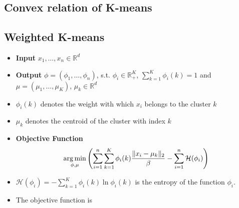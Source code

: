 \documentclass{article}
\begin{document}
\subsection{Convex relation of K-means}


\subsection{Weighted K-means}

\begin{itemize}
    \item \textbf{Input} $x_1, \dots, x_n \in \mathbb{R}^d$
    \item \textbf{Output} $\phi=(\phi_1, \dots, \phi_n)$, s.t. $\phi_i \in \mathbb{R}^K_+$, $\sum_{k=1}^K\phi_i(k)=1$ and $\mu=(\mu_1, \dots, \mu_K)$, $\mu_k \in \mathbb{R}^d$
    \item $\phi_i(k)$ denotes the weight with which $x_i$ belongs to the cluster $k$
    \item $\mu_k$ denotes the centroid of the cluster with index $k$
    \item \textbf{Objective Function} $$\operatorname*{arg\,min}_{\phi, \mu} \left( \sum_{i=1}^n \sum_{k=1}^K \phi_i(k) \frac{\Vert x_i-\mu_k \Vert_2}{\beta} - \sum_{i=1}^n\mathcal{H}(\phi_i) \right)$$
    \item $\mathcal{H}(\phi_i) = -\sum_{k=1}^K \phi_i(k)\ln{\phi_i(k)}$ is the entropy of the function $\phi_i$.
    \item The objective function is 
\end{itemize}
\end{document}
